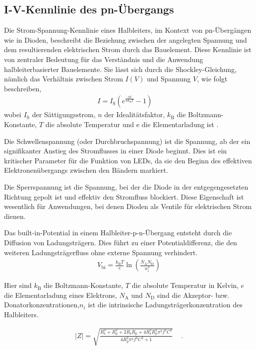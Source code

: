 \subsection{I-V-Kennlinie des pn-Übergangs}
Die Strom-Spannung-Kennlinie eines Halbleiters, im Kontext von pn-Übergängen wie in Dioden, beschreibt die Beziehung zwischen der angelegten Spannung und dem resultierenden elektrischen Strom durch das Bauelement. Diese Kennlinie ist von zentraler Bedeutung für das Verständnis und die Anwendung halbleiterbasierter Bauelemente.
Sie lässt sich durch die Shockley-Gleichung, nämlich das Verhältnis zwischen Strom $I(V)$ und Spannung $V$, wie folgt beschreiben,
\begin{align}
    \label{eq:IV}
    I = I_\mathrm{S} \left( e^{\frac{\mathrm{e}V}{nk_\mathrm{B}T}} - 1 \right) \quad \, 
\end{align}
wobei $I_\mathrm{S}$ der Sättigungsstrom, $n$ der Idealitätsfaktor, $k_\mathrm{B}$ die Boltzmann-Konstante, $T$ die absolute Temperatur und $\mathrm{e}$ die Elementarladung ist \cite{SkriptF13}.


Die Schwellenspannung (oder Durchbruchspannung) ist die Spannung, ab der ein signifikanter Anstieg des Stromflusses in einer Diode beginnt. Dies ist ein kritischer Parameter für die Funktion von LEDs, da sie den Beginn des effektiven Elektronenübergangs zwischen den Bändern markiert.

Die Sperrspannung ist die Spannung, bei der die Diode in der entgegengesetzten Richtung gepolt ist und effektiv den Stromfluss blockiert. Diese Eigenschaft ist wesentlich für Anwendungen, bei denen Dioden als Ventile für elektrischen Strom dienen.



Das built-in-Potential in einem Halbleiter-p-n-Übergang entsteht durch die Diffusion von Ladungsträgern. Dies führt zu einer Potentialdifferenz, die den weiteren Ladungsträgerfluss ohne externe Spannung verhindert.
\begin{align}
 V_\mathrm{bi} = \frac{k_\mathrm{B}T}{e} \ln\left(\frac{N_\mathrm{A} N_\mathrm{D}}{n_i^2}\right)
\end{align}

Hier sind $k_\mathrm{B}$ die Boltzmann-Konstante, $T$ die absolute Temperatur in Kelvin, $e$ die Elementarladung eines Elektrons, $N_\mathrm{A}$ und $N_\mathrm{D}$ sind die Akzeptor- bzw. Donatorkonzentrationen,$n_i$ ist die intrinsische Ladungsträgerkonzentration des Halbleiters.




\begin{align}
    \label{eq:Impedanz}
    |Z| = \sqrt{\frac{R_\mathrm{s}^2+R_\mathrm{p}^2+2R_\mathrm{s}R_\mathrm{p}+4R_\mathrm{s}^2R_\mathrm{p}^2\pi^2f^2C^2}{4R_\mathrm{p}^2\pi^2f^2C^2+1}} \quad \, .
\end{align}
\cite{SkriptF13}